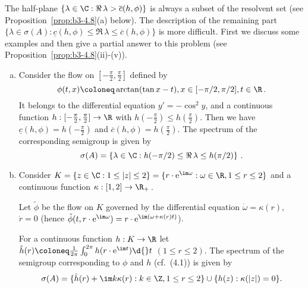 The half-plane $\{\lambda \in \C : \Re\,\lambda  > \overline{c}(h,\phi)\}$ is always a subset of the resolvent set (see Proposition~\ref{prop:b3-4.8}(a) below).
The description of the remaining part $\{\lambda \in \sigma(A) : \underline{c}(h,\phi) \leq \Re\,\lambda  \leq \overline{c}(h,\phi)\}$ is more difficult.
First we discuss some examples and then give a partial answer to this problem (see Proposition~\ref{prop:b3-4.8}(ii)-(v)).
%
\begin{example}\label{ex:b3-4.7}
	\begin{enumerate}[(a), wide]
		\item 
		Consider the flow on $[-\frac{\pi}{2},\frac{\pi}{2}]$ defined by
		\[
		\phi(t,x)\coloneq \arctan(\tan x - t) , x \in [-{\pi}/{2},{\pi}/{2}], 
		t \in \R\,.
		\] 
		It belongs to the differential equation $y' = -\cos^2y$,  and a continuous function $h : [-\frac{\pi}{2},\frac{\pi}{2}] \to \R$ with $h(-\frac{\pi}{2}) \leq h(\frac{\pi}{2})$.
		Then we have $\underline{c}(h,\phi) = h(-\frac{\pi}{2})$ and $\overline{c}(h,\phi) = h(\frac{\pi}{2})$.
		The spectrum of the corresponding semigroup is given by 
		\[
		\sigma(A) = \left\{\lambda \in \C : h(-\pi/2) \leq \Re\,\lambda  \leq h(\pi/2)\right\}\,.
		\]
		
		\item 
		Consider $K = \{z \in \C : 1 \leq |z| \leq 2\} = \{r\cdot \mathrm{e}^{\mathcal{\im\omega}} : \omega\in \R, 1 \leq r \leq 2\}$ and a continuous function $\kappa: [1,2] \to \R_+$\,.
		
		Let $\tilde{\phi}$ be the flow on $K$ governed by the differential equation $\dot{\omega} = \kappa(r)$, $\dot{r} = 0$ (hence $\tilde{\phi}(t,r\cdot \mathrm{e}^{\im\omega}) = r\cdot \mathrm{e}^{\im(\omega + \kappa(r)t)}$).
		
		For a continuous function $h: K \to \R$ let $\hat{h}(r) \coloneq \frac{1}{2\pi}\int_{0}^{2\pi} h(r\cdot \mathrm{e}^{\im t}) \d{}t$ $(1 \leq r \leq 2)$.
		The spectrum of the semigroup corresponding to $\phi$ and $h$ (cf.\ (4.1)) is given by
		\[
		\sigma(A) = \{\hat{h}(r) +  \im k\kappa(r) : k \in \Z, 1 \leq r \leq 2\} \cup \{h(z) : \kappa(|z|) = 0\}.
		\]
	\end{enumerate}
\end{example}
